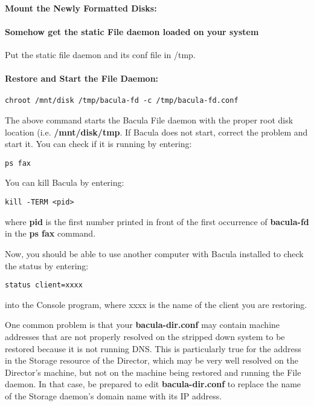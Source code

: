 \paragraph*{Mount the Newly Formatted Disks:}


\paragraph*{Somehow get the static File daemon loaded on your system}
Put the static file daemon and its conf file in /tmp.

\paragraph*{Restore and Start the File Daemon:}
\footnotesize
\begin{verbatim}
chroot /mnt/disk /tmp/bacula-fd -c /tmp/bacula-fd.conf
\end{verbatim}
\normalsize

The above command starts the Bacula File daemon with the proper root disk
location (i.e. {\bf /mnt/disk/tmp}. If Bacula does not start, correct the
problem and start it. You can check if it is running by entering: 

\footnotesize
\begin{verbatim}
ps fax
\end{verbatim}
\normalsize

You can kill Bacula by entering: 

\footnotesize
\begin{verbatim}
kill -TERM <pid>
\end{verbatim}
\normalsize

where {\bf pid} is the first number printed in front of the first occurrence
of {\bf bacula-fd} in the {\bf ps fax} command. 

Now, you should be able to use another computer with Bacula installed to check
the status by entering: 

\footnotesize
\begin{verbatim}
status client=xxxx
\end{verbatim}
\normalsize

into the Console program, where xxxx is the name of the client you are
restoring. 

One common problem is that your {\bf bacula-dir.conf} may contain machine
addresses that are not properly resolved on the stripped down system to be
restored because it is not running DNS. This is particularly true for the
address in the Storage resource of the Director, which may be very well
resolved on the Director's machine, but not on the machine being restored and
running the File daemon. In that case, be prepared to edit {\bf
bacula-dir.conf} to replace the name of the Storage daemon's domain name with
its IP address. 


